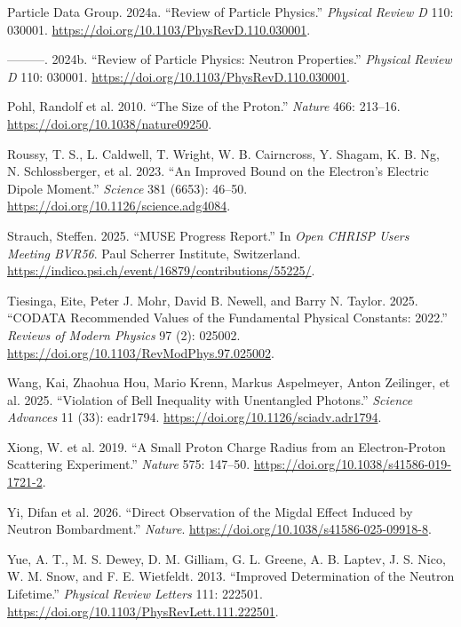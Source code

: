 \documentclass[
  11pt,
  letterpaper,
  twoside,
  openany]{book}
\newlength{\cslhangindent}
\newenvironment{CSLReferences}[2] %
 {\begin{list}{}{%
  \setlength{\itemindent}{0pt}
  \setlength{\leftmargin}{0pt}
  \setlength{\parsep}{0pt}
  \ifodd #1
   \setlength{\leftmargin}{\cslhangindent}
   \setlength{\itemindent}{-1\cslhangindent}
  \fi
  \setlength{\itemsep}{#2\baselineskip}}}
 {\end{list}}
\begin{document}
\begin{CSLReferences}{1}{0}
Particle Data Group. 2024a. {``Review of Particle Physics.''}
\emph{Physical Review D} 110: 030001.
\url{https://doi.org/10.1103/PhysRevD.110.030001}.

---------. 2024b. {``Review of Particle Physics: Neutron Properties.''}
\emph{Physical Review D} 110: 030001.
\url{https://doi.org/10.1103/PhysRevD.110.030001}.

Pohl, Randolf et al. 2010. {``The Size of the Proton.''} \emph{Nature}
466: 213--16. \url{https://doi.org/10.1038/nature09250}.

Roussy, T. S., L. Caldwell, T. Wright, W. B. Cairncross, Y. Shagam, K.
B. Ng, N. Schlossberger, et al. 2023. {``An Improved Bound on the
Electron's Electric Dipole Moment.''} \emph{Science} 381 (6653): 46--50.
\url{https://doi.org/10.1126/science.adg4084}.

Strauch, Steffen. 2025. {``{MUSE} Progress Report.''} In \emph{Open
CHRISP Users Meeting BVR56}. Paul Scherrer Institute, Switzerland.
\url{https://indico.psi.ch/event/16879/contributions/55225/}.

Tiesinga, Eite, Peter J. Mohr, David B. Newell, and Barry N. Taylor.
2025. {``{CODATA} Recommended Values of the Fundamental Physical
Constants: 2022.''} \emph{Reviews of Modern Physics} 97 (2): 025002.
\url{https://doi.org/10.1103/RevModPhys.97.025002}.

Wang, Kai, Zhaohua Hou, Mario Krenn, Markus Aspelmeyer, Anton Zeilinger,
et al. 2025. {``Violation of {Bell} Inequality with Unentangled
Photons.''} \emph{Science Advances} 11 (33): eadr1794.
\url{https://doi.org/10.1126/sciadv.adr1794}.

Xiong, W. et al. 2019. {``A Small Proton Charge Radius from an
Electron-Proton Scattering Experiment.''} \emph{Nature} 575: 147--50.
\url{https://doi.org/10.1038/s41586-019-1721-2}.

Yi, Difan et al. 2026. {``Direct Observation of the {Migdal} Effect
Induced by Neutron Bombardment.''} \emph{Nature}.
\url{https://doi.org/10.1038/s41586-025-09918-8}.

Yue, A. T., M. S. Dewey, D. M. Gilliam, G. L. Greene, A. B. Laptev, J.
S. Nico, W. M. Snow, and F. E. Wietfeldt. 2013. {``Improved
Determination of the Neutron Lifetime.''} \emph{Physical Review Letters}
111: 222501. \url{https://doi.org/10.1103/PhysRevLett.111.222501}.

\end{CSLReferences}


\backmatter
\end{document}
